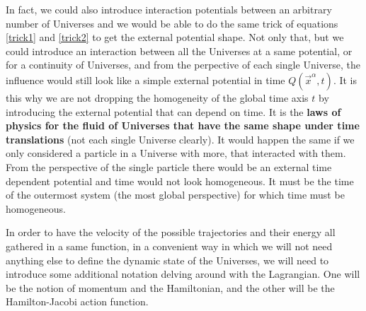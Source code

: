 \documentclass[11pt, a4paper]{article} %
\begin{document}
{In fact, we could also introduce interaction potentials between an arbitrary number of Universes and we would be able to do the same trick of equations \eqref{trick1} and \eqref{trick2} to get the external potential shape. Not only that, but we could introduce an interaction between all the Universes at a same potential, or for a continuity of Universes, and from the perpective of each single Universe, the influence would still look like a simple external potential in time $Q(\vec{x}^\alpha,t)$. It is this why we are not dropping the homogeneity of the global time axis $t$ by introducing the external potential that can depend on time. It is the {\bf laws of physics for the fluid of Universes that have the same shape under time translations} (not each single Universe clearly). It would happen the same if we only considered a particle in a Universe with more, that interacted with them. From the perspective of the single particle there would be an external time dependent potential and time would not look homogeneous. It must be the time of the outermost system (the most global perspective) for which time must be homogeneous.
}

In order to have the velocity of the possible trajectories and their energy all gathered in a same function, in a convenient way in which we will not need anything else to define the dynamic state of the Universes, we will need to introduce some additional notation delving around with the Lagrangian. One will be the notion of momentum and the Hamiltonian, and the other will be the Hamilton-Jacobi action function.
\end{document}
